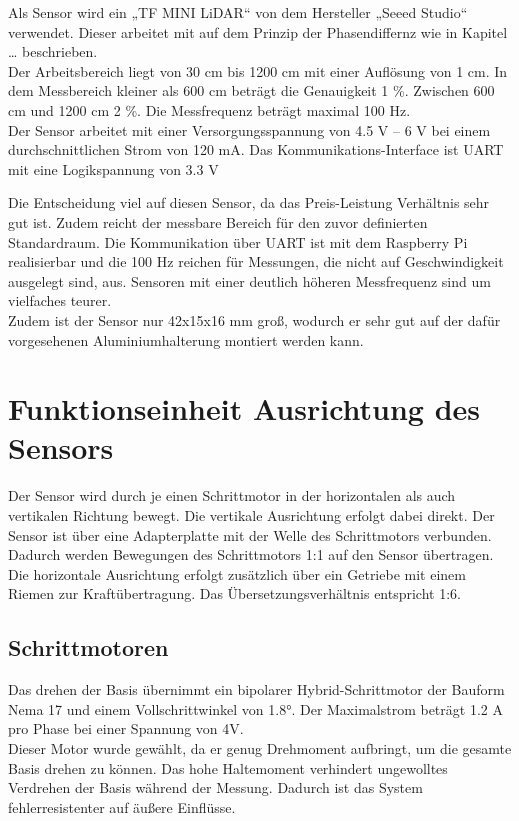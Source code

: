 Als Sensor wird ein „TF MINI LiDAR“ von dem Hersteller „Seeed Studio“ verwendet. Dieser arbeitet mit auf dem Prinzip der Phasendiffernz wie in Kapitel … beschrieben.\\
Der Arbeitsbereich liegt von 30 cm bis 1200 cm mit einer Auflösung von 1 cm. In dem Messbereich kleiner als 600 cm beträgt die Genauigkeit 1 \%. Zwischen 600 cm und 1200 cm 2 \%. Die Messfrequenz beträgt maximal 100 Hz.\\
Der Sensor arbeitet mit einer Versorgungsspannung von 4.5 V – 6 V bei einem durchschnittlichen Strom von 120 mA. Das Kommunikations-Interface ist UART mit eine Logikspannung von 3.3 V

Die Entscheidung viel auf diesen Sensor, da das Preis-Leistung Verhältnis sehr gut ist. Zudem reicht der messbare Bereich für den zuvor definierten Standardraum. Die Kommunikation über UART ist mit dem Raspberry Pi realisierbar und die 100 Hz reichen für Messungen, die nicht auf Geschwindigkeit ausgelegt sind, aus. Sensoren mit einer deutlich höheren Messfrequenz sind um vielfaches teurer.\\
Zudem ist der Sensor nur 42x15x16 mm groß, wodurch er sehr gut auf der dafür vorgesehenen Aluminiumhalterung montiert werden kann. 


\section{Funktionseinheit Ausrichtung des Sensors}

Der Sensor wird durch je einen Schrittmotor in der horizontalen als auch vertikalen Richtung bewegt. Die vertikale Ausrichtung erfolgt dabei direkt. Der Sensor ist über eine Adapterplatte mit der Welle des Schrittmotors verbunden. Dadurch werden Bewegungen des Schrittmotors 1:1 auf den Sensor übertragen.\\
Die horizontale Ausrichtung erfolgt zusätzlich über ein Getriebe mit einem Riemen zur Kraftübertragung. Das Übersetzungsverhältnis entspricht 1:6. 

\subsection{Schrittmotoren}
Das drehen der Basis übernimmt ein bipolarer Hybrid-Schrittmotor der Bauform Nema 17 und einem Vollschrittwinkel von 1.8°. Der Maximalstrom beträgt 1.2 A pro Phase bei einer Spannung von 4V.\\
Dieser Motor wurde gewählt, da er genug Drehmoment aufbringt, um die gesamte Basis drehen zu können. Das hohe Haltemoment verhindert ungewolltes Verdrehen der Basis während der Messung. Dadurch ist das System fehlerresistenter auf äußere Einflüsse. 


